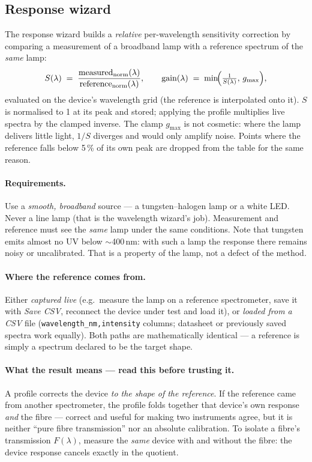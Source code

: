\subsection{Response wizard}
\label{sec:cal-response}

The response wizard builds a \emph{relative} per-wavelength sensitivity
correction by comparing a measurement of a broadband lamp with a reference
spectrum of the \emph{same} lamp:
\[
  S(\lambda) \;=\;
  \frac{\text{measured}_{\mathrm{norm}}(\lambda)}
       {\text{reference}_{\mathrm{norm}}(\lambda)},
  \qquad
  \text{gain}(\lambda) \;=\; \min\!\Bigl(\tfrac{1}{S(\lambda)},\,
  g_{\max}\Bigr),
\]
evaluated on the device's wavelength grid (the reference is interpolated onto
it). $S$ is normalised to 1 at its peak and stored; applying the profile
multiplies live spectra by the clamped inverse. The clamp $g_{\max}$ is not
cosmetic: where the lamp delivers little light, $1/S$ diverges and would only
amplify noise. Points where the reference falls below 5\,\% of its own peak
are dropped from the table for the same reason.

\paragraph{Requirements.}
Use a \emph{smooth, broadband} source --- a tungsten--halogen lamp or a white
LED. Never a line lamp (that is the wavelength wizard's job). Measurement and
reference must see the \emph{same} lamp under the same conditions. Note that
tungsten emits almost no UV below $\sim$400\,nm: with such a lamp the response
there remains noisy or uncalibrated. That is a property of the lamp, not a
defect of the method.

\paragraph{Where the reference comes from.}
Either \emph{captured live} (e.g.\ measure the lamp on a reference
spectrometer, save it with \emph{Save CSV}, reconnect the device under test
and load it), or \emph{loaded from a CSV} file
(\texttt{wavelength\_nm,intensity} columns; datasheet or previously saved
spectra work equally). Both paths are mathematically identical --- a reference
is simply a spectrum declared to be the target shape.

\paragraph{What the result means --- read this before trusting it.}
A profile corrects the device \emph{to the shape of the reference}. If the
reference came from another spectrometer, the profile folds together that
device's own response \emph{and} the fibre --- correct and useful for making
two instruments agree, but it is neither ``pure fibre transmission'' nor an
absolute calibration. To isolate a fibre's transmission $F(\lambda)$, measure
the \emph{same} device with and without the fibre: the device response cancels
exactly in the quotient.

